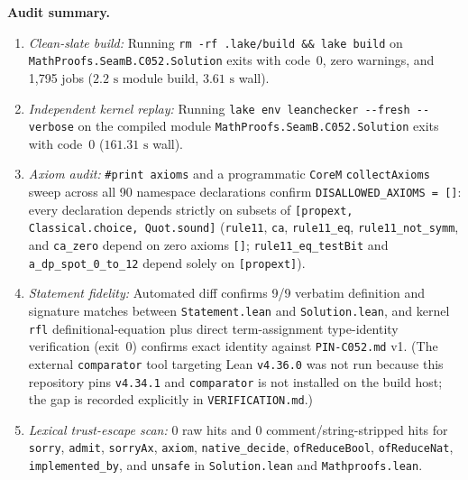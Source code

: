 \documentclass[11pt]{article}
\theoremstyle{definition}
\begin{document}
\noindent\textbf{Audit summary.}
\begin{enumerate}\setlength{\itemsep}{2pt}
\item \emph{Clean-slate build:} Running \texttt{rm -rf .lake/build \&\& lake build} on \nolinkurl{MathProofs.SeamB.C052.Solution} exits with code~$0$, zero warnings, and 1{,}795 jobs ($2.2\text{ s}$ module build, $3.61\text{ s}$ wall).
\item \emph{Independent kernel replay:} Running \texttt{lake env leanchecker -{}-fresh -{}-verbose} on the compiled module \nolinkurl{MathProofs.SeamB.C052.Solution} exits with code~$0$ ($161.31\text{ s}$ wall).
\item \emph{Axiom audit:} \texttt{\#print axioms} and a programmatic \texttt{CoreM} \texttt{collectAxioms} sweep across all 90 namespace declarations confirm \texttt{DISALLOWED\_AXIOMS = []}: every declaration depends strictly on subsets of \texttt{[propext, Classical.choice, Quot.sound]} (\texttt{rule11}, \texttt{ca}, \texttt{rule11\_eq}, \texttt{rule11\_not\_symm}, and \texttt{ca\_zero} depend on zero axioms \texttt{[]}; \texttt{rule11\_eq\_testBit} and \texttt{a\_dp\_spot\_0\_to\_12} depend solely on \texttt{[propext]}).
\item \emph{Statement fidelity:} Automated diff confirms 9/9 verbatim definition and signature matches between \texttt{Statement.lean} and \texttt{Solution.lean}, and kernel \texttt{rfl} definitional-equation plus direct term-assignment type-identity verification (exit~$0$) confirms exact identity against \texttt{PIN-C052.md} v1. (The external \texttt{comparator} tool targeting Lean \texttt{v4.36.0} was not run because this repository pins \texttt{v4.34.1} and \texttt{comparator} is not installed on the build host; the gap is recorded explicitly in \texttt{VERIFICATION.md}.)
\item \emph{Lexical trust-escape scan:} $0$ raw hits and $0$ comment/string-stripped hits for \texttt{sorry}, \texttt{admit}, \texttt{sorryAx}, \texttt{axiom}, \texttt{native\_decide}, \texttt{ofReduceBool}, \texttt{ofReduceNat}, \texttt{implemented\_by}, and \texttt{unsafe} in \texttt{Solution.lean} and \texttt{Mathproofs.lean}.
\end{enumerate}
\end{document}
